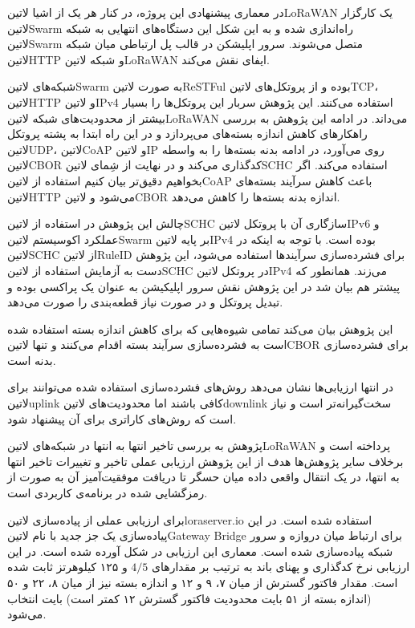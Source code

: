 در معماری پیشنهادی این پروژه، در کنار هر یک از اشیا ‌لاتین{LoRaWAN} یک کارگزار ‌لاتین{Swarm} راه‌اندازی شده و به این شکل
این دستگاه‌های انتهایی به شبکه ‌لاتین{Swarm} متصل می‌شوند. سرور اپلیشکن در قالب پل ارتباطی میان شبکه ‌لاتین{HTTP}
و شبکه ‌لاتین{LoRaWAN} ایفای نقش می‌کند.

شبکه‌های ‌لاتین{Swarm} به صورت ‌لاتین{ReSTFul} بوده و از پروتکل‌های ‌لاتین{TCP}، ‌لاتین{HTTP} و ‌لاتین{IPv4}
استفاده می‌کنند. این پژوهش سربار این پروتکل‌ها را بسیار بیشتر از محدودیت‌های شبکه ‌لاتین{LoRaWAN} می‌داند.
در ادامه این پژوهش به بررسی راهکارهای کاهش اندازه بسته‌های می‌پردازد و در این راه ابتدا به پشته پروتکل ‌لاتین{UDP}، ‌لاتین{CoAP} و ‌لاتین{IP}
روی می‌آورد، در ادامه بدنه بسته‌ها را به واسطه ‌لاتین{CBOR} کدگذاری می‌کند
و در نهایت از شِمای ‌لاتین{SCHC} استفاده می‌کند.
اگر بخواهیم دقیق‌تر بیان کنیم استفاده از ‌لاتین{CoAP} باعث کاهش سرآیند بسته‌های ‌لاتین{HTTP} می‌شود و ‌لاتین{CBOR}
اندازه بدنه بسته‌ها را کاهش می‌دهد.

چالش این پژوهش در استفاده از ‌لاتین{SCHC} سازگاری آن با پروتکل ‌لاتین{IPv6} و عملکرد اکوسیستم ‌لاتین{Swarm}
بر پایه ‌لاتین{IPv4} بوده است.
با توجه به اینکه در ‌لاتین{SCHC} از ‌لاتین{RuleID} برای فشرده‌سازی سرآیندها استفاده می‌شود، این پژوهش دست به آزمایش
استفاده از ‌لاتین{SCHC} در پروتکل ‌لاتین{IPv4} می‌زند.
همانطور که پیشتر هم بیان شد در این پژوهش نقش سرور اپلیکیشن به عنوان یک پراکسی بوده و تبدیل پروتکل و در صورت نیاز
قطعه‌بندی را صورت می‌دهد.

این پژوهش بیان می‌کند تمامی شیوه‌هایی که برای کاهش اندازه بسته استفاده شده است به فشرده‌سازی سرآیند بسته اقدام می‌کنند
و تنها ‌لاتین{CBOR} برای فشرده‌سازی بدنه است.

در انتها ارزیابی‌ها نشان می‌دهد روش‌های فشرده‌سازی استفاده شده می‌توانند برای ‌لاتین{uplink} کافی باشند اما
محدودیت‌های ‌لاتین{downlink} سخت‌گیرانه‌تر است و نیاز است که روش‌های کاراتری برای آن پیشنهاد شود.



پژوهش  به بررسی تاخیر انتها به انتها در شبکه‌های ‌لاتین{LoRaWAN} پرداخته است و برخلاف سایر پژوهش‌ها هدف از این پژوهش
ارزیابی عملی تاخیر و تغییرات تاخیر انتها به انتها، در یک انتقال واقعی داده میان حسگر تا دریافت موفقیت‌آمیز آن به صورت از رمزگشایی شده در برنامه‌ی کاربردی است.

برای ارزیابی عملی از پیاده‌سازی ‌لاتین{loraserver.io} استفاده شده است. در این پیاده‌سازی یک جز جدید با نام ‌لاتین{Gateway Bridge}
برای ارتباط میان دروازه و سرور شبکه پیاده‌سازی شده است. معماری این ارزیابی در شکل  آورده شده است.
در این ارزیابی نرخ کدگذاری و پهنای باند به ترتیب بر مقدارهای $4/5$ و ۱۲۵ کیلوهرتز ثابت شده است.
مقدار فاکتور گسترش از میان ۷، ۹ و ۱۲ و اندازه بسته نیز از میان ۸، ۲۲ و ۵۰ (اندازه بسته از ۵۱ بایت محدودیت فاکتور گسترش ۱۲ کمتر است) بایت انتخاب می‌شود.

